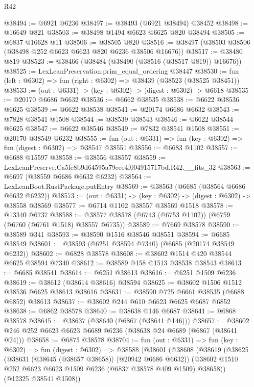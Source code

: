 \begin{lexlean}{R42}
\begin{coremodule}
{@38494 := @6921 @6236
@38497 := @38493 (@6921 @38494) @38452
@38498 := @16649 @821
@38503 := @38498 @1494 @6623 @6625 @820 @38494
@38505 := @6837 @16628 @11
@38506 := @38505 @820
@38516 := @38497 (@38503 @38506 (@38498 @252 @6623 @6623 @820 @6236 @38506 @16676))
@38517 := @38480 @819
@38523 := @38466 (@38484 (@38490 (@38516 (@38517 @819)) @16676))
@38525 := LexLeanPreservation.prim_equal_ordering @38447
@38530 := fun (left : @6302) => fun (right : @6302) => @38439 (@38523 (@38525 @38451))
@38533 := (out : @6331) -> (key : @6302) -> (digest : @6302) -> @6618
@38535 := @20170 @6686 @6632
@38536 := @6662 @38535
@38538 := @6622 @38536 @6625
@38539 := @6622 @38538
@38541 := @20174 @6686 @6632
@38543 := @7828 @38541 @1508
@38544 := @38539 @38543
@38546 := @6622 @38544 @6625
@38547 := @6622 @38546
@38549 := @7832 @38541 @1508
@38551 := @20170 @38549 @6232
@38555 := fun (out : @6331) => fun (key : @6302) => fun (digest : @6302) => @38547 @38551
@38556 := @6683 @1102
@38557 := @6688 @15597
@38558 := @38556 @38557
@38559 := LexLeanPreserve.Ca5fe8b9d64595a79eee4f004915717bd.R42.__fits_32
@38563 := @6697 (@38559 @6686 @6632 @6232)
@38564 := LexLeanBoot.RustPackage.putEntry
@38569 := @38563 (@6685 (@38564 @6686 @6632 @6232))
@38573 := (out : @6331) -> (key : @6302) -> (digest : @6302) -> @38558 @38569
@38577 := @6714 @1102 @38557 @38569 @1518
@38578 := @13340 @6737
@38588 := @38577 @38578 (@6743 (@6753 @1102)) (@6759 (@6760 (@6761 @1518) @38557 @6735))
@38589 := @7669 @38578
@38590 := @38589 @341
@38593 := @38590 @1516 @38546 @38551
@38594 := @6685 @38549
@38601 := @38593 (@6251 @38594 @7340) (@6685 (@20174 @38549 @6232))
@38602 := @6828 @38578
@38608 := @38602 @1514 @420 @38544 @6625 @38594 @7340
@38612 := @38589 @158 @1513 @38538 @38543
@38613 := @6685 @38541
@38614 := @6251 @38613
@38616 := @6251 @1509 @6236
@38619 := @38612 (@38614 @38616) @38594
@38625 := @38602 @1506 @1512 @38536 @6625 @38613 @38616
@38631 := @38590 @725 @6661 @38535 (@6688 @6852) @38613
@38637 := @38602 @244 @610 @6623 @6625 @6687 @6852
@38638 := @6862 @38578
@38640 := @38638 @146 @6687
@38641 := @6868 @38578
@38645 := @38637 (@38640 (@6867 (@38641 @146)))
@38657 := @38602 @246 @252 @6623 @6623 @6689 @6236 (@38638 @24 @6689 (@6867 (@38641 @24)))
@38658 := @6875 @38578
@38704 := fun (out : @6331) =>
  fun (key : @6302) =>
  fun (digest : @6302) =>
  @38588
    (@38601
      (@38608
        (@38619
          (@38625
            (@38631 (@38645 (@38657 @38658)) (@20942 @6686 @6632))
            (@38602 @1510 @252 @6623 @6623 @1509 @6236 (@6837 @38578 @409 @1509) @38658))
          (@12325 @38541 @1508))
}
\end{coremodule}
\end{lexlean}
